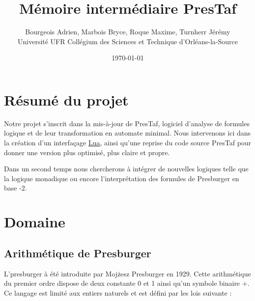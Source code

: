 \documentclass{article}%
\begin{document}
\title{Mémoire intermédiaire PresTaf}


\author{Bourgeois Adrien, Marbois Bryce, Roque Maxime, Turnherr Jérémy%
\\Université UFR Collégium des Sciences et Technique d'Orléans-la-Source}
\date{\today}
\maketitle



\clearpage

\tableofcontents

\cleardoublepage

\section{Résumé du projet}

Notre projet s'inscrit dans la mis-à-jour de PresTaf, logiciel d'analyse de formules logique et de leur transformation en automate minimal. Nous intervenons ici dans la création d'un interfaçage \href{https://fr.wikipedia.org/wiki/Lua}{Lua}, ainsi qu'une reprise du code source PresTaf pour donner une version plus optimisé, plus claire et propre.\\\par

Dans un second temps nous chercherons à intégrer de nouvelles logiques telle que la logique monadique ou encore l'interprétation des formules de Presburger en base -2.

\section{Domaine}


\subsection{Arithmétique de Presburger}

L'\gls{presburger} à été introduite par Moj\.{z}esz Presburger en 1929. Cette arithmétique du premier ordre dispose de deux constante 0 et 1 ainsi qu'un symbole binaire +. Ce langage est limité aux entiers naturels et est défini par les lois suivante :
\end{document}
